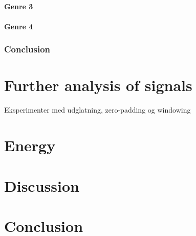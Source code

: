 \paragraph{Genre 3}

\paragraph{Genre 4}

\subsubsection{Conclusion}

\section{Further analysis of signals}
Eksperimenter med udglatning, zero-padding og windowing 

\section{Energy}

\section{Discussion}

\section{Conclusion}